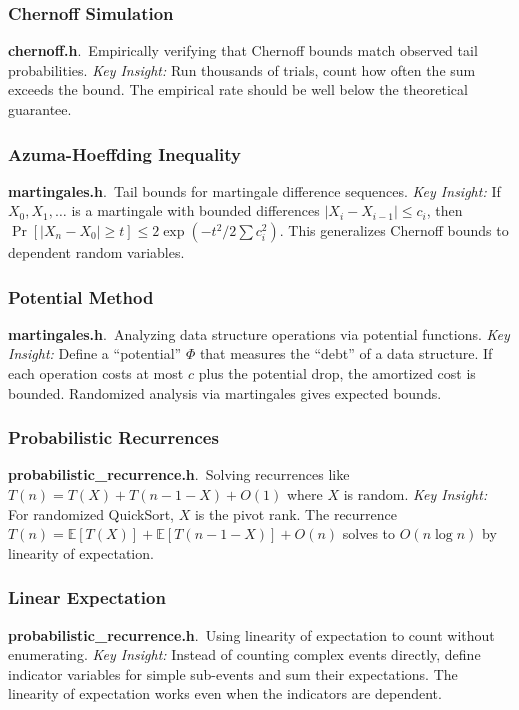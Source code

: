 \documentclass[11pt,a4paper]{article}
\newcommand{\algo}[2]{\textbf{#1}.\ #2}
\newcommand{\insight}{\textit{Key Insight: }}
\begin{document}
\subsubsection{Chernoff Simulation}
\algo{chernoff.h}{Empirically verifying that Chernoff bounds match observed tail probabilities.}
\insight Run thousands of trials, count how often the sum exceeds the bound. The empirical rate should be well below the theoretical guarantee.

\subsubsection{Azuma-Hoeffding Inequality}
\algo{martingales.h}{Tail bounds for martingale difference sequences.}
\insight If \(X_0, X_1, \ldots\) is a martingale with bounded differences \(|X_i - X_{i-1}| \le c_i\), then \(\Pr[|X_n - X_0| \ge t] \le 2\exp(-t^2 / 2\sum c_i^2)\). This generalizes Chernoff bounds to dependent random variables.

\subsubsection{Potential Method}
\algo{martingales.h}{Analyzing data structure operations via potential functions.}
\insight Define a ``potential'' \(\Phi\) that measures the ``debt'' of a data structure. If each operation costs at most \(c\) plus the potential drop, the amortized cost is bounded. Randomized analysis via martingales gives expected bounds.

\subsubsection{Probabilistic Recurrences}
\algo{probabilistic\_recurrence.h}{Solving recurrences like \(T(n) = T(X) + T(n - 1 - X) + O(1)\) where \(X\) is random.}
\insight For randomized QuickSort, \(X\) is the pivot rank. The recurrence \(T(n) = \mathbb{E}[T(X)] + \mathbb{E}[T(n-1-X)] + O(n)\) solves to \(O(n \log n)\) by linearity of expectation.

\subsubsection{Linear Expectation}
\algo{probabilistic\_recurrence.h}{Using linearity of expectation to count without enumerating.}
\insight Instead of counting complex events directly, define indicator variables for simple sub-events and sum their expectations. The linearity of expectation works even when the indicators are dependent.
\end{document}
